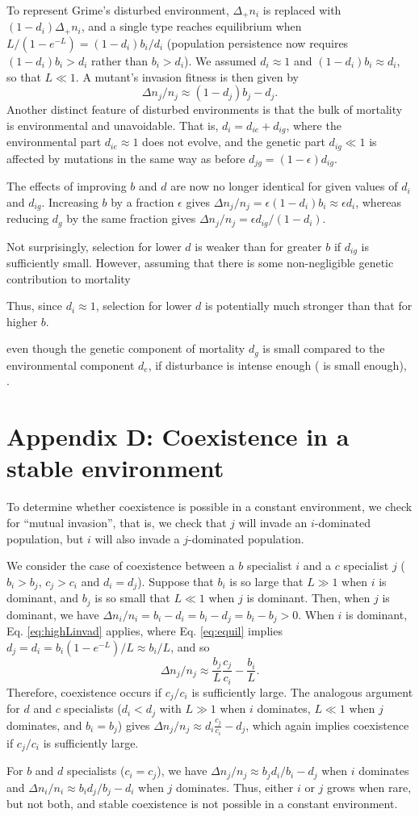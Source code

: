 \documentclass[11pt]{article}
\begin{document}
To represent Grime's disturbed environment, $\Delta_+ n_i$ is replaced with $(1-d_i)\Delta_+ n_i$, and a single type reaches equilibrium when $L/(1-e^{-L})=(1-d_i)b_i/d_i$ (population persistence now requires $(1-d_i)b_i>d_i$ rather than $b_i>d_i$). We assumed $d_i\approx 1$ and $(1-d_i)b_i\approx d_i$, so that $L\ll 1$. A mutant's invasion fitness is then given by
\begin{equation}
\Delta n_j/n_j \approx (1-d_j)b_j - d_j.
\end{equation}
Another distinct feature of disturbed environments is that the bulk of mortality is environmental and unavoidable. That is, $d_i=d_{ie}+d_{ig}$, where the environmental part $d_{ie}\approx 1$ does not evolve, and the genetic part $d_{ig}\ll 1$ is affected by mutations in the same way as before $d_{jg}=(1-\epsilon) d_{ig}$.

The effects of improving $b$ and $d$ are now no longer identical for given values of $d_i$ and $d_{ig}$. Increasing $b$ by a fraction $\epsilon$ gives $\Delta n_j/n_j = \epsilon (1-d_i)b_i\approx \epsilon d_i$, whereas reducing $d_g$ by the same fraction gives $\Delta n_j/n_j = \epsilon d_{ig}/(1-d_i)$. 

Not surprisingly, selection for lower $d$ is weaker than for greater $b$ if $d_{ig}$ is sufficiently small. However, assuming that there is some non-negligible genetic contribution to mortality

Thus, since $d_i\approx 1$, selection for lower $d$ is potentially much stronger than that for higher $b$. 

even though the genetic component of mortality $d_{g}$ is small compared to the environmental component $d_{e}$, if disturbance is intense enough ( is small enough), .

\section*{Appendix D: Coexistence in a stable environment}

To determine whether coexistence is possible in a constant environment, we check for ``mutual invasion'', that is, we check that $j$ will invade an $i$-dominated population, but $i$ will also invade a $j$-dominated population. 

We consider the case of coexistence between a $b$ specialist $i$ and a $c$ specialist $j$ ($b_i>b_j$, $c_j>c_i$ and $d_i=d_j$). Suppose that $b_i$ is so large that $L\gg 1$ when $i$ is dominant, and $b_j$ is so small that $L\ll 1$ when $j$ is dominant. Then, when $j$ is dominant, we have $\Delta n_i/n_i=b_i-d_i=b_i-d_j=b_i-b_j>0$. When $i$ is dominant, Eq.  \eqref{eq:highLinvad} applies, where Eq. \eqref{eq:equil} implies $d_j=d_i=b_i(1-e^{-L})/L\approx b_i/L$, and so
\begin{equation}
\Delta n_j/n_j \approx \frac{b_j}{L}\frac{c_j}{c_i}-\frac{b_i}{L}.
\end{equation}
Therefore, coexistence occurs if $c_j/c_i$ is sufficiently large. The analogous argument for $d$ and $c$ specialists ($d_i<d_j$ with $L\gg 1$ when $i$ dominates, $L\ll 1$ when $j$ dominates, and $b_i=b_j$) gives $\Delta n_j/n_j \approx d_i\frac{c_j}{c_i}-d_j$, which again implies coexistence if $c_j/c_i$ is sufficiently large.

For $b$ and $d$ specialists ($c_i=c_j$), we have $\Delta n_j/n_j\approx b_j d_i/b_i-d_j$ when $i$ dominates and $\Delta n_i/n_i\approx b_i d_j/b_j-d_i$ when $j$ dominates. Thus, either $i$ or $j$ grows when rare, but not both, and stable coexistence is not possible in a constant environment.
\end{document}
